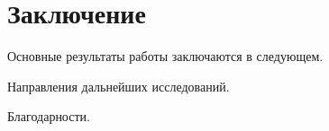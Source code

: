 \chapter*{Заключение}                       %


Основные результаты работы заключаются в следующем.


Направления дальнейших исследований.

Благодарности.




